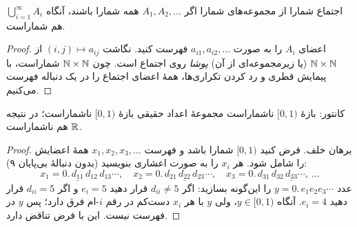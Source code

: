 \begin{figblock}

\end{figblock}

\begin{theorem}{اجتماع شمارا از مجموعه‌های شمارا}
اگر $A_1,A_2,\dots$ همه شمارا باشند، آنگاه $\bigcup_{i=1}^\infty A_i$ هم شماراست.
\end{theorem}

\begin{proof}
اعضای $A_i$ را به صورت $a_{i1},a_{i2},\dots$ فهرست کنید. نگاشت $(i,j)\mapsto a_{ij}$ از $\mathbb{N}\times\mathbb{N}$ (یا زیرمجموعه‌ای از آن) \emph{پوشا} روی اجتماع است. چون $\mathbb{N}\times\mathbb{N}$ شماراست، با پیمایش قطری و رد کردن تکراری‌ها، همهٔ اعضای اجتماع را در یک دنباله فهرست می‌کنیم.
\end{proof}

\begin{theorem}[label=thm:cantor]{کانتور: بازهٔ $[0,1)$ ناشماراست}
مجموعهٔ اعداد حقیقی بازهٔ $[0,1)$ ناشماراست؛ در نتیجه $\mathbb{R}$ هم ناشماراست.
\end{theorem}

\begin{proof}
برهان خلف. فرض کنید $[0,1)$ شمارا باشد و فهرست $x_1,x_2,x_3,\dots$ همهٔ اعضایش را شامل شود. هر $x_i$ را به صورت اعشاری بنویسید (بدون دنبالهٔ بی‌پایان ۹):
\[
x_1=0.\,\underline{d_{11}}\,d_{12}\,d_{13}\cdots,\quad
x_2=0.\,d_{21}\,\underline{d_{22}}\,d_{23}\cdots,\quad
x_3=0.\,d_{31}\,d_{32}\,\underline{d_{33}}\cdots,\ \dots
\]
عدد $y=0.\,e_1e_2e_3\cdots$ را این‌گونه بسازید: اگر $d_{ii}\neq 5$ قرار دهید $e_i=5$ و اگر $d_{ii}=5$ قرار دهید $e_i=4$. آنگاه $y\in[0,1)$، ولی $y$ با هر $x_i$ دست‌کم در رقم $i$-ام فرق دارد؛ پس $y$ در فهرست نیست. این با فرض تناقض دارد.
\end{proof}

